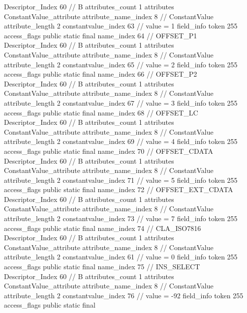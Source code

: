 {{{{{				Descriptor_Index	60		// B
				attributes_count	1
				attributes {
				ConstantValue_attribute {
					attribute_name_index	8		// ConstantValue
					attribute_length	2
					constantvalue_index	63		// value = 1
				}
				}
			}
			field_info {
				token	255
				access_flags	public static final
				name_index	64		// OFFSET_P1
				Descriptor_Index	60		// B
				attributes_count	1
				attributes {
				ConstantValue_attribute {
					attribute_name_index	8		// ConstantValue
					attribute_length	2
					constantvalue_index	65		// value = 2
				}
				}
			}
			field_info {
				token	255
				access_flags	public static final
				name_index	66		// OFFSET_P2
				Descriptor_Index	60		// B
				attributes_count	1
				attributes {
				ConstantValue_attribute {
					attribute_name_index	8		// ConstantValue
					attribute_length	2
					constantvalue_index	67		// value = 3
				}
				}
			}
			field_info {
				token	255
				access_flags	public static final
				name_index	68		// OFFSET_LC
				Descriptor_Index	60		// B
				attributes_count	1
				attributes {
				ConstantValue_attribute {
					attribute_name_index	8		// ConstantValue
					attribute_length	2
					constantvalue_index	69		// value = 4
				}
				}
			}
			field_info {
				token	255
				access_flags	public static final
				name_index	70		// OFFSET_CDATA
				Descriptor_Index	60		// B
				attributes_count	1
				attributes {
				ConstantValue_attribute {
					attribute_name_index	8		// ConstantValue
					attribute_length	2
					constantvalue_index	71		// value = 5
				}
				}
			}
			field_info {
				token	255
				access_flags	public static final
				name_index	72		// OFFSET_EXT_CDATA
				Descriptor_Index	60		// B
				attributes_count	1
				attributes {
				ConstantValue_attribute {
					attribute_name_index	8		// ConstantValue
					attribute_length	2
					constantvalue_index	73		// value = 7
				}
				}
			}
			field_info {
				token	255
				access_flags	public static final
				name_index	74		// CLA_ISO7816
				Descriptor_Index	60		// B
				attributes_count	1
				attributes {
				ConstantValue_attribute {
					attribute_name_index	8		// ConstantValue
					attribute_length	2
					constantvalue_index	61		// value = 0
				}
				}
			}
			field_info {
				token	255
				access_flags	public static final
				name_index	75		// INS_SELECT
				Descriptor_Index	60		// B
				attributes_count	1
				attributes {
				ConstantValue_attribute {
					attribute_name_index	8		// ConstantValue
					attribute_length	2
					constantvalue_index	76		// value = -92
				}
				}
			}
			field_info {
				token	255
				access_flags	public static final
}}}}}
